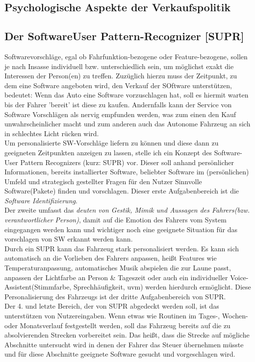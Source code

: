 \subsection{Psychologische Aspekte der Verkaufspolitik}
\subsection{Der SoftwareUser Pattern-Recognizer [SUPR]}
\label{text:supr}
Softwarevorschläge, egal ob Fahrfunktion-bezogene oder Feature-bezogene, sollen je nach Insasse individuell bzw. unterschiedlich sein, um möglichst exakt die Interessen der Person(en) zu treffen. Zuzüglich hierzu muss der Zeitpunkt, zu dem eine Software angeboten wird, den Verkauf der SOftware unterstützen, bedeutet: Wenn das Auto eine Software vorzuschlagen hat, soll es hiermit warten bis der Fahrer 'bereit' ist diese zu kaufen. Andernfalls kann der Service von Software Vorschlägen als nervig empfunden werden, was zum einen den Kauf unwahrscheinlicher macht und zum anderen auch das Autonome Fahrzeug an sich in schlechtes Licht rücken wird.\\
Um personalisierte SW-Vorschläge liefern zu können und diese dann zu geeigneten Zeitpunkten anzeigen zu lassen, stelle ich ein Konzept des Software-User Pattern Recognizers (kurz: SUPR) vor. Dieser soll anhand persönlicher Informationen, bereits installierter Software, beliebter Software im (persönlichen) Umfeld und strategisch gestellter Fragen für den Nutzer Sinnvolle Software(Pakete) finden und vorschlagen. Dieser erste Aufgabenbereich ist die \textit{Software Identifizierung}.\\
Der zweite umfasst das \textit{deuten von Gestik, Mimik und Aussagen des Fahrers(bzw. verantwortlicher Person)}, damit auf die Emotion des Fahrers vom System eingegangen werden kann und wichtiger noch eine geeignete Situation für das vorschlagen von SW erkannt werden kann.\\
Durch ein SUPR kann das Fahrzeug stark personalisiert werden. Es kann sich automatisch an die Vorlieben des Fahrers anpassen, heißt Features wie Temperaturanpassung, automatisches Musik abspielen die zur Laune passt, anpassen der Lichtfarbe an Person \& Tageszeit oder auch ein individueller Voice-Assistent(Stimmfarbe, Sprechhäufigkeit, uvm) werden hierdurch ermöglicht. Diese Personalisierung des Fahrzeugs ist der dritte Aufgabenbereich von SUPR.\\
Der 4. und letzte Bereich, der von SUPR abgedeckt werden soll, ist das unterstützen von Nutzereingaben. Wenn etwas wie Routinen im Tages-, Wochen- oder Monatsverlauf festgestellt werden, soll das Fahrzeug bereits auf die zu absolvierenden Strecken vorbereitet sein. Das heißt, dass die Strecke auf mögliche Abschnitte untersucht wird in denen der Fahrer das Steuer übernehmen müsste und für diese Abschnitte geeignete Software gesucht und vorgeschlagen wird.\\
